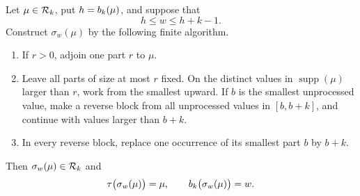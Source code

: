 \begin{lemma}\label{lem:block-transfer}
Let $\mu\in\mathcal{R}_k$, put $h=b_k(\mu)$, and suppose that
\begin{equation}\label{eq:admissible-weight}
 h\leq w\leq h+k-1.
\end{equation}
Construct $\sigma_w(\mu)$ by the following finite algorithm.
\begin{enumerate}
\item If $r>0$, adjoin one part $r$ to $\mu$.
\item Leave all parts of size at most $r$ fixed. On the distinct values in
$\operatorname{supp}(\mu)$ larger than $r$, work from the smallest upward. If
$b$ is the smallest unprocessed value, make a reverse block from all
unprocessed values in $[b,b+k]$, and continue with values larger than $b+k$.
\item In every reverse block, replace one occurrence of its smallest part $b$
by $b+k$.
\end{enumerate}
Then $\sigma_w(\mu)\in\mathcal{R}_k$ and
\begin{equation}\label{eq:transfer-inverse}
 \tau\bigl(\sigma_w(\mu)\bigr)=\mu,
 \qquad
 b_k\bigl(\sigma_w(\mu)\bigr)=w.
\end{equation}
\end{lemma}

